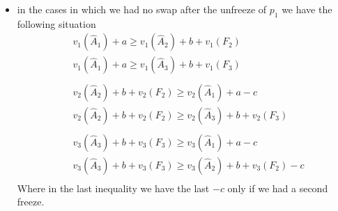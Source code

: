 \begin{itemize}
    \item in the cases in which we had no swap after the unfreeze of $p_1$ we have the following situation 
    \begin{align*}
    &v_1(\hat A_1) + a \ge v_1(\hat A_2) + b + v_1(F_2)\\
    &v_1(\hat A_1) + a \ge v_1(\hat A_3) + b + v_1(F_3)\\
    \\
    &v_2(\hat A_2) + b + v_2(F_2) \ge v_2(\hat A_1) + a - c \\
    &v_2(\hat A_2) + b + v_2(F_2) \ge v_2(\hat A_3) + b + v_2(F_3)\\
    \\
    &v_3(\hat A_3) + b + v_3(F_3) \ge v_3(\hat A_1) + a - c\\
    &v_3(\hat A_3) + b + v_3(F_3) \ge v_3(\hat A_2) + b + v_3(F_2) - c\\
    \end{align*}
Where in the last inequality we have the last $-c$ only if we had a second freeze.


\end{itemize}
